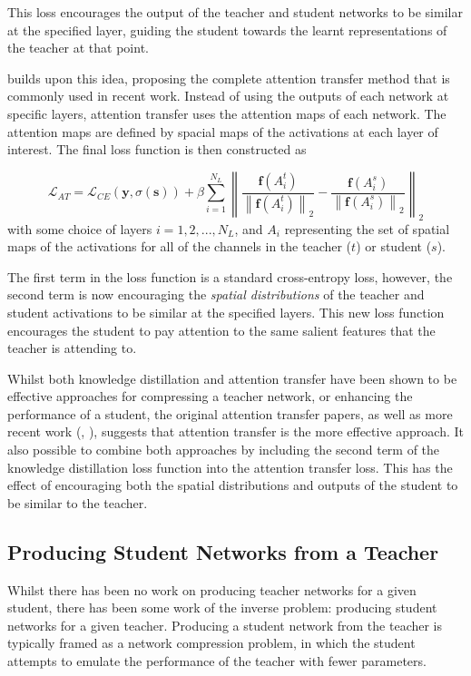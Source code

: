 \documentclass[a4paper,11pt]{article}
\begin{document}
This loss encourages the output of the teacher and student networks to be similar at the specified layer, guiding the student towards the learnt representations of the teacher at that point. 

\cite{zagoruyko2016paying} builds upon this idea, proposing the complete attention transfer method that is commonly used in recent work. Instead of using the outputs of each network at specific layers, attention transfer uses the attention maps of each network. The attention maps are defined by spacial maps of the activations at each layer of interest. The final loss function is then constructed as

\begin{equation}
    \mathcal{L}_{A T}=\mathcal{L}_{C E}(\mathbf{y}, \sigma(\mathbf{s}))+\beta \sum_{i=1}^{N_{L}}\left\|\frac{\mathbf{f}\left(A_{i}^{t}\right)}{\left\|\mathbf{f}\left(A_{i}^{t}\right)\right\|_{2}}-\frac{\mathbf{f}\left(A_{i}^{s}\right)}{\left\|\mathbf{f}\left(A_{i}^{s}\right)\right\|_{2}}\right\|_{2}
    \label{eq:AT}
\end{equation}
with some choice of layers $i= 1, 2, ..., N_L$, and $A_i$ representing the set of spatial maps of the activations for all of the channels in the teacher ($t$) or student ($s$). 

The first term in the loss function is a standard cross-entropy loss, however, the second term is now encouraging the \emph{spatial distributions} of the teacher and student activations to be similar at the specified layers. This new loss function encourages the student to pay attention to the same salient features that the teacher is attending to.

Whilst both knowledge distillation and attention transfer have been shown to be effective approaches for compressing a teacher network, or enhancing the performance of a student, the original attention transfer papers, as well as more recent work (\cite{crowley2018moonshine}, \cite{turner2019distilling}),  suggests that attention transfer is the more effective approach. It also possible to combine both approaches by including the second term of the knowledge distillation loss function into the attention transfer loss. This has the effect of encouraging both the spatial distributions and outputs of the student to be similar to the teacher.


\subsection{Producing Student Networks from a Teacher}
Whilst there has been no work on producing teacher networks for a given student, there has been some work of the inverse problem: producing student networks for a given teacher. Producing a student network from the teacher is typically framed as a network compression problem, in which the student attempts to emulate the performance of the teacher with fewer parameters. 
\end{document}
